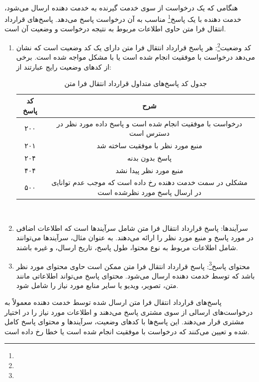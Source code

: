 \paragraph{}
{
    هنگامی که یک درخواست از سوی خدمت گیرنده به خدمت دهنده‌ ارسال می‌شود، خدمت دهنده‌ با یک پاسخ\footnote{} مناسب به آن درخواست پاسخ می‌دهد. پاسخ‌های قرارداد انتقال فرا متن حاوی اطلاعات مربوط به نتیجه درخواست و وضعیت آن است.
    \begin{enumerate}
        \item کد وضعیت\footnote{}: هر پاسخ قرارداد انتقال فرا متن دارای یک کد وضعیت است که نشان می‌دهد درخواست با موفقیت انجام شده است یا با مشکل مواجه شده است. برخی از کدهای وضعیت رایج عبارتند از:
            \begin{table}[h]
                \begin{tabular}{|c|c|}
                \hline
                کد پاسخ & شرح                                                                                  \\ \hline
                ۲۰۰     & درخواست ﺑﺎ ﻣﻮﻓﻘﯿﺖ اﻧﺠﺎم ﺷﺪه اﺳﺖ و پاسخ داده ﻣﻮرد ﻧﻈﺮ در دﺳﺘﺮس اﺳﺖ                     \\ \hline
                ۲۰۱     & منبع مورد نظر با موفقیت ساخته شد                     \\ \hline
                ۲۰۴     & پاسخ بدون بدنه                     \\ \hline
                ۴۰۴     & ﻣﻨﺒﻊ ﻣﻮرد ﻧﻈﺮ پیدا ﻧﺸﺪ                                                               \\ \hline
                ۵۰۰     & مشکلی در ﺳﻤﺖ ﺧﺪﻣﺖ دﻫﻨﺪه رخ داده اﺳﺖ که ﻣﻮﺟﺐ ﻋﺪم ﺗﻮاﻧﺎﯾی در ارﺳﺎل پاسخ ﻣﻮرد ﻧﻈﺮﺷﺪه اﺳﺖ \\ \hline
                \end{tabular}
                \caption{جدول کد پاسخ‌های متداول قرارداد انتقال فرا متن}
                \label{http_status_codes_table}
            \end{table}
            \\
        \item سرآیندها: پاسخ قرارداد انتقال فرا متن شامل سرآیندها است که اطلاعات اضافی در مورد پاسخ و منبع مورد نظر را ارائه می‌دهند. به عنوان مثال، سرآیندها می‌توانند شامل اطلاعات مربوط به نوع محتوا، طول پاسخ، تاریخ ارسال، و غیره باشند.
        \item محتوای پاسخ\footnote{}: پاسخ قرارداد انتقال فرا متن ممکن است حاوی محتوای مورد نظر باشد که توسط خدمت دهنده‌ ارسال می‌شود. محتوای پاسخ می‌تواند اطلاعاتی مانند متن، تصویر، ویدیو یا سایر منابع مورد نیاز را شامل شود.
    \end{enumerate}
    پاسخ‌های قرارداد انتقال فرا متن ارسال شده توسط خدمت دهنده‌ معمولاً به درخواست‌های ارسالی از سوی مشتری پاسخ می‌دهند و اطلاعات مورد نیاز را در اختیار مشتری قرار می‌دهند. این پاسخ‌ها با کدهای وضعیت، سرآیندها و محتوای پاسخ کامل شده و تعیین می‌کنند که درخواست با موفقیت انجام شده است یا خطا رخ داده است.
}

